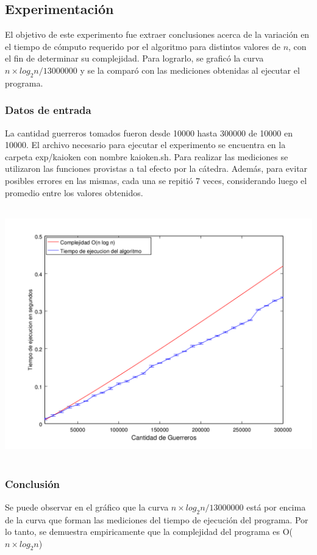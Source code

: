     \subsection{Experimentación}
		El objetivo de este experimento fue extraer conclusiones acerca de la variación en el tiempo de cómputo requerido por el algoritmo para distintos valores de $n$, con el fin de determinar su complejidad. 
    Para lograrlo, se graficó la curva $n \times log_{2}n / 13000000$ y se la comparó con las mediciones obtenidas al ejecutar el programa.

    \subsubsection*{Datos de entrada}
    La cantidad guerreros tomados fueron  desde 10000 hasta 300000 de 10000 en 10000.
    El archivo necesario para ejecutar el experimento se encuentra en la carpeta exp/kaioken con nombre kaioken.sh. 
		Para realizar las mediciones se  utilizaron las funciones provistas a tal efecto por la cátedra. Además, para evitar posibles errores en las mismas, cada una se repitió 7 veces, considerando luego el promedio entre los valores obtenidos. 



      \includegraphics[height=11cm]{graficos/kaioken-exp.png}



		\subsubsection*{Conclusión}
			Se puede observar en el gráfico que la curva $n \times log_{2}n / 13000000$ está por encima de la curva que forman las mediciones del tiempo de ejecución del programa. Por lo tanto, se demuestra empiricamente que la complejidad del programa es O($n \times log_{2}n$)
